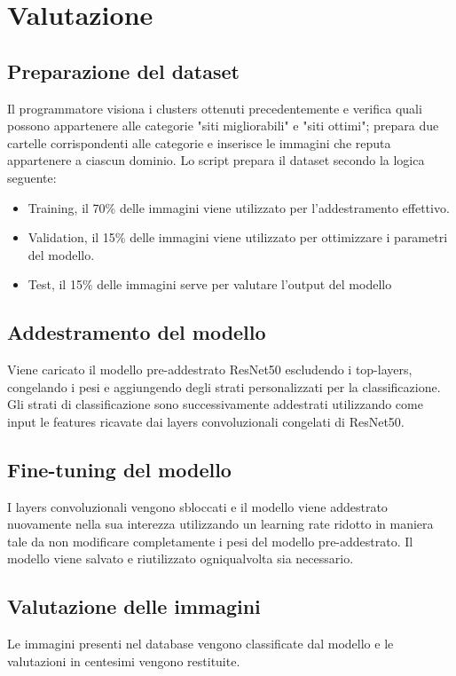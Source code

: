 
\section{Valutazione}

\subsection{Preparazione del dataset}
Il programmatore visiona i clusters ottenuti precedentemente e verifica quali possono appartenere alle categorie "siti migliorabili" e "siti ottimi"; prepara due cartelle corrispondenti alle categorie e inserisce le immagini che reputa appartenere a ciascun dominio.
Lo script prepara il dataset secondo la logica seguente:
\begin{itemize}
  \item Training, il 70\% delle immagini viene utilizzato per l'addestramento effettivo.
  \item Validation, il 15\% delle immagini viene utilizzato per ottimizzare i parametri del modello.
  \item Test, il 15\% delle immagini serve per valutare l'output del modello
\end{itemize}

\subsection{Addestramento del modello}
Viene caricato il modello pre-addestrato ResNet50 escludendo i top-layers, congelando i pesi e aggiungendo degli strati personalizzati per la classificazione.
Gli strati di classificazione sono successivamente addestrati utilizzando come input le features ricavate dai layers convoluzionali congelati di ResNet50. 

\subsection{Fine-tuning del modello}
I layers convoluzionali vengono sbloccati e il modello viene addestrato nuovamente nella sua interezza utilizzando un learning rate ridotto in maniera tale da non modificare completamente i pesi del modello pre-addestrato.
Il modello viene salvato e riutilizzato ogniqualvolta sia necessario.

\subsection{Valutazione delle immagini}
Le immagini presenti nel database vengono classificate dal modello e le valutazioni in centesimi vengono restituite.

